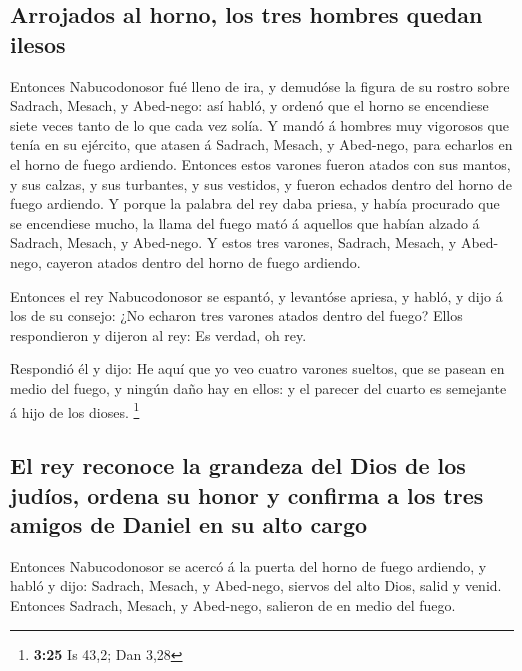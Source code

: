 \hypertarget{arrojados-al-horno-los-tres-hombres-quedan-ilesos}{%
\subsection{Arrojados al horno, los tres hombres quedan
ilesos}\label{arrojados-al-horno-los-tres-hombres-quedan-ilesos}}

 Entonces Nabucodonosor fué lleno de ira, y demudóse la
figura de su rostro sobre Sadrach, Mesach, y Abed-nego: así habló, y
ordenó que el horno se encendiese siete veces tanto de lo que cada vez
solía.  Y mandó á hombres muy vigorosos que tenía en su
ejército, que atasen á Sadrach, Mesach, y Abed-nego, para echarlos en el
horno de fuego ardiendo.  Entonces estos varones fueron
atados con sus mantos, y sus calzas, y sus turbantes, y sus vestidos, y
fueron echados dentro del horno de fuego ardiendo.  Y
porque la palabra del rey daba priesa, y había procurado que se
encendiese mucho, la llama del fuego mató á aquellos que habían alzado á
Sadrach, Mesach, y Abed-nego.  Y estos tres varones,
Sadrach, Mesach, y Abed-nego, cayeron atados dentro del horno de fuego
ardiendo.

 Entonces el rey Nabucodonosor se espantó, y levantóse
apriesa, y habló, y dijo á los de su consejo: ¿No echaron tres varones
atados dentro del fuego? Ellos respondieron y dijeron al rey: Es verdad,
oh rey.

 Respondió él y dijo: He aquí que yo veo cuatro varones
sueltos, que se pasean en medio del fuego, y ningún daño hay en ellos: y
el parecer del cuarto es semejante á hijo de los dioses. \footnote{\textbf{3:25}
  Is 43,2; Dan 3,28}

\hypertarget{el-rey-reconoce-la-grandeza-del-dios-de-los-juduxedos-ordena-su-honor-y-confirma-a-los-tres-amigos-de-daniel-en-su-alto-cargo}{%
\subsection{El rey reconoce la grandeza del Dios de los judíos, ordena
su honor y confirma a los tres amigos de Daniel en su alto
cargo}\label{el-rey-reconoce-la-grandeza-del-dios-de-los-juduxedos-ordena-su-honor-y-confirma-a-los-tres-amigos-de-daniel-en-su-alto-cargo}}

 Entonces Nabucodonosor se acercó á la puerta del horno
de fuego ardiendo, y habló y dijo: Sadrach, Mesach, y Abed-nego, siervos
del alto Dios, salid y venid. Entonces Sadrach, Mesach, y Abed-nego,
salieron de en medio del fuego.

